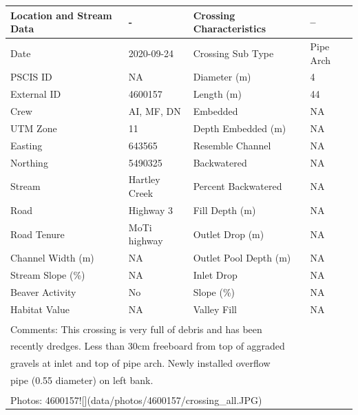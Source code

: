 \documentclass[
]{book}
\begin{document}
\begin{tabular}{llll}
\toprule
Location and Stream Data & - & Crossing Characteristics & --\\
\midrule
Date & 2020-09-24 & Crossing Sub Type & Pipe Arch\\
PSCIS ID & NA & Diameter (m) & 4\\
External ID & 4600157 & Length (m) & 44\\
Crew & AI, MF, DN & Embedded & NA\\
UTM Zone & 11 & Depth Embedded (m) & NA\\
\addlinespace
Easting & 643565 & Resemble Channel & NA\\
Northing & 5490325 & Backwatered & NA\\
Stream & Hartley Creek & Percent Backwatered & NA\\
Road & Highway 3 & Fill Depth (m) & NA\\
Road Tenure & MoTi highway & Outlet Drop (m) & NA\\
\addlinespace
Channel Width (m) & NA & Outlet Pool Depth (m) & NA\\
Stream Slope (\%) & NA & Inlet Drop & NA\\
Beaver Activity & No & Slope (\%) & NA\\
Habitat Value & NA & Valley Fill & NA\\
\bottomrule
\multicolumn{4}{l}{\textsuperscript{} Comments: This crossing is very full of debris and has been}\\
\multicolumn{4}{l}{recently dredges.  Less than 30cm freeboard from top of aggraded}\\
\multicolumn{4}{l}{gravels at inlet and top of pipe arch.  Newly installed overflow}\\
\multicolumn{4}{l}{pipe (0.55 diameter) on left bank.}\\
\multicolumn{4}{l}{\textsuperscript{} Photos: 4600157![](data/photos/4600157/crossing\_all.JPG)}\\
\end{tabular}
\end{document}
